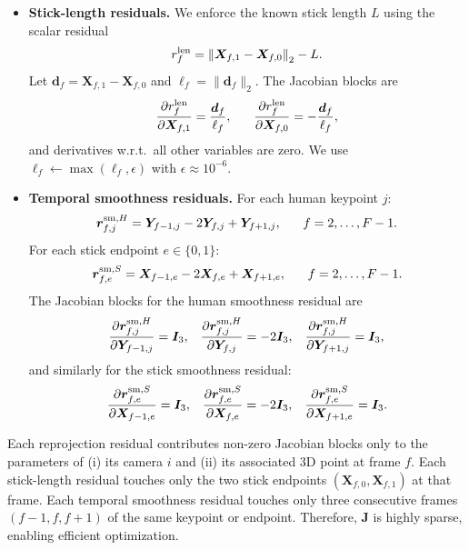 \documentclass[a4paper, 10pt, conference]{ieeeconf}      %
\newcommand{\vect}[1]{\bm{#1}}
\newcommand{\mat}[1]{\bm{#1}}
\begin{document}
\begin{itemize}
\item \textbf{Stick-length residuals.}
We enforce the known stick length $L$ using the scalar residual
\begin{equation}\footnotesize
r_f^{\text{len}}
=
\left\|\vect{X}_{f,1}-\vect{X}_{f,0}\right\|_2 - L.
\end{equation}
Let $\vect{d}_f = \vect{X}_{f,1}-\vect{X}_{f,0}$ and $\ell_f=\|\vect{d}_f\|_2$. The Jacobian blocks are
\begin{equation}\footnotesize
\frac{\partial r_f^{\text{len}}}{\partial \vect{X}_{f,1}}
=
\frac{\vect{d}_f}{\ell_f},
\qquad
\frac{\partial r_f^{\text{len}}}{\partial \vect{X}_{f,0}}
=
-\frac{\vect{d}_f}{\ell_f},
\end{equation}
and derivatives w.r.t.\ all other variables are zero. We use $\ell_f \leftarrow \max(\ell_f,\epsilon)$ with $\epsilon \approx 10^{-6}$.

\item \textbf{Temporal smoothness residuals.}
For each human keypoint $j$:
\begin{equation}\footnotesize
\vect{r}_{f,j}^{\text{sm},H}
=
\vect{Y}_{f-1,j} - 2\vect{Y}_{f,j} + \vect{Y}_{f+1,j},
\qquad f=2,\dots,F-1.
\end{equation}
For each stick endpoint $e\in\{0,1\}$:
\begin{equation}\footnotesize
\vect{r}_{f,e}^{\text{sm},S}
=
\vect{X}_{f-1,e} - 2\vect{X}_{f,e} + \vect{X}_{f+1,e},
\qquad f=2,\dots,F-1.
\end{equation}
The Jacobian blocks for the human smoothness residual are
\begin{equation}\footnotesize
\frac{\partial \vect{r}_{f,j}^{\text{sm},H}}{\partial \vect{Y}_{f-1,j}}=\mat{I}_3,\quad
\frac{\partial \vect{r}_{f,j}^{\text{sm},H}}{\partial \vect{Y}_{f,j}}=-2\mat{I}_3,\quad
\frac{\partial \vect{r}_{f,j}^{\text{sm},H}}{\partial \vect{Y}_{f+1,j}}=\mat{I}_3,
\end{equation}
and similarly for the stick smoothness residual:
\begin{equation}\footnotesize
\frac{\partial \vect{r}_{f,e}^{\text{sm},S}}{\partial \vect{X}_{f-1,e}}=\mat{I}_3,\quad
\frac{\partial \vect{r}_{f,e}^{\text{sm},S}}{\partial \vect{X}_{f,e}}=-2\mat{I}_3,\quad
\frac{\partial \vect{r}_{f,e}^{\text{sm},S}}{\partial \vect{X}_{f+1,e}}=\mat{I}_3.
\end{equation}

\end{itemize}

Each reprojection residual contributes non-zero Jacobian blocks only to the parameters of (i) its camera $i$ and (ii) its associated 3D point at frame $f$. Each stick-length residual touches only the two stick endpoints $(\vect{X}_{f,0}, \vect{X}_{f,1})$ at that frame. Each temporal smoothness residual touches only three consecutive frames $(f-1,f,f+1)$ of the same keypoint or endpoint. Therefore, $\mat{J}$ is highly sparse, enabling efficient optimization.
\end{document}
